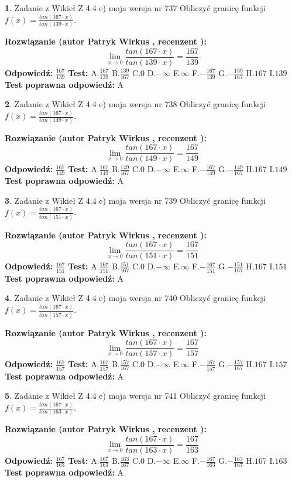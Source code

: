 \documentclass[12pt, a4paper]{article}
\theoremstyle{definition} %
\newtheorem{zad}{}
\newcommand{\zadStart}[1]{\begin{zad}#1\newline}
\newcommand{\zadStop}{\end{zad}}
\newcommand{\rozwStart}[2]{\noindent \textbf{Rozwiązanie (autor #1 , recenzent #2): }\newline}
\newcommand{\rozwStop}{\newline}
\newcommand{\odpStart}{\noindent \textbf{Odpowiedź:}\newline}
\newcommand{\odpStop}{\newline}
\newcommand{\testStart}{\noindent \textbf{Test:}\newline}
\newcommand{\testStop}{\newline}
\newcommand{\kluczStart}{\noindent \textbf{Test poprawna odpowiedź:}\newline}
\newcommand{\kluczStop}{\newline}
\begin{document}
\zadStart{Zadanie z Wikieł Z 4.4 e) moja wersja nr 737}
Obliczyć granicę funkcji $f(x)=\frac{tan(167\cdot x)}{tan(139\cdot x)}$.
\zadStop
\rozwStart{Patryk Wirkus}{}
$$\lim\limits_{x\to 0}\frac{tan(167\cdot x)}{tan(139\cdot x)}=
\frac{167}{139}$$
\rozwStop
\odpStart
$\frac{167}{139}$
\odpStop
\testStart
A.$\frac{167}{139}$
B.$\frac{139}{167}$
C.$0$
D.$-\infty$
E.$\infty$
F.$-\frac{167}{139}$
G.$-\frac{139}{167}$
H.$167$
I.$139$
\testStop
\kluczStart
A
\kluczStop



\zadStart{Zadanie z Wikieł Z 4.4 e) moja wersja nr 738}
Obliczyć granicę funkcji $f(x)=\frac{tan(167\cdot x)}{tan(149\cdot x)}$.
\zadStop
\rozwStart{Patryk Wirkus}{}
$$\lim\limits_{x\to 0}\frac{tan(167\cdot x)}{tan(149\cdot x)}=
\frac{167}{149}$$
\rozwStop
\odpStart
$\frac{167}{149}$
\odpStop
\testStart
A.$\frac{167}{149}$
B.$\frac{149}{167}$
C.$0$
D.$-\infty$
E.$\infty$
F.$-\frac{167}{149}$
G.$-\frac{149}{167}$
H.$167$
I.$149$
\testStop
\kluczStart
A
\kluczStop



\zadStart{Zadanie z Wikieł Z 4.4 e) moja wersja nr 739}
Obliczyć granicę funkcji $f(x)=\frac{tan(167\cdot x)}{tan(151\cdot x)}$.
\zadStop
\rozwStart{Patryk Wirkus}{}
$$\lim\limits_{x\to 0}\frac{tan(167\cdot x)}{tan(151\cdot x)}=
\frac{167}{151}$$
\rozwStop
\odpStart
$\frac{167}{151}$
\odpStop
\testStart
A.$\frac{167}{151}$
B.$\frac{151}{167}$
C.$0$
D.$-\infty$
E.$\infty$
F.$-\frac{167}{151}$
G.$-\frac{151}{167}$
H.$167$
I.$151$
\testStop
\kluczStart
A
\kluczStop



\zadStart{Zadanie z Wikieł Z 4.4 e) moja wersja nr 740}
Obliczyć granicę funkcji $f(x)=\frac{tan(167\cdot x)}{tan(157\cdot x)}$.
\zadStop
\rozwStart{Patryk Wirkus}{}
$$\lim\limits_{x\to 0}\frac{tan(167\cdot x)}{tan(157\cdot x)}=
\frac{167}{157}$$
\rozwStop
\odpStart
$\frac{167}{157}$
\odpStop
\testStart
A.$\frac{167}{157}$
B.$\frac{157}{167}$
C.$0$
D.$-\infty$
E.$\infty$
F.$-\frac{167}{157}$
G.$-\frac{157}{167}$
H.$167$
I.$157$
\testStop
\kluczStart
A
\kluczStop



\zadStart{Zadanie z Wikieł Z 4.4 e) moja wersja nr 741}
Obliczyć granicę funkcji $f(x)=\frac{tan(167\cdot x)}{tan(163\cdot x)}$.
\zadStop
\rozwStart{Patryk Wirkus}{}
$$\lim\limits_{x\to 0}\frac{tan(167\cdot x)}{tan(163\cdot x)}=
\frac{167}{163}$$
\rozwStop
\odpStart
$\frac{167}{163}$
\odpStop
\testStart
A.$\frac{167}{163}$
B.$\frac{163}{167}$
C.$0$
D.$-\infty$
E.$\infty$
F.$-\frac{167}{163}$
G.$-\frac{163}{167}$
H.$167$
I.$163$
\testStop
\kluczStart
A
\kluczStop
\end{document}
